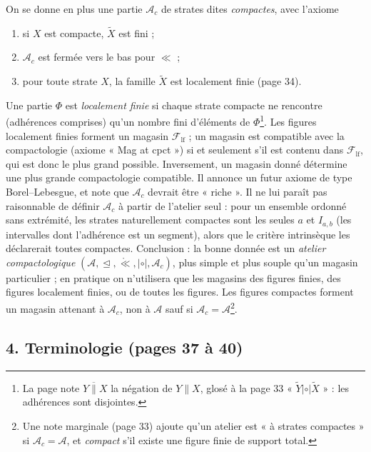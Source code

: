 \documentclass[11pt,a4paper]{article}
\begin{document}
On se donne en plus une partie $\mathcal{A}_{c}$ de strates dites
\emph{compactes}, avec l'axiome
\begin{enumerate}
\item[a)] si $X$ est compacte, $\widetilde{X}$ est fini ;
\item[b)] $\mathcal{A}_{c}$ est fermée vers le bas pour $\ll$ ;
\item[c)] pour toute strate $X$, la famille $\widetilde{X}$ est localement finie
(page 34).
\end{enumerate}
Une partie $\Phi$ est \emph{localement finie} si chaque strate compacte ne
rencontre (adhérences comprises) qu'un nombre fini d'éléments de
$\Phi$\footnote{La page note $Y \mathbin{\overline{\|}} X$ la négation de $Y
\mathbin{\|} X$, glosé à la page 33 « $\widetilde{Y} \mathrel{|\circ|}
\widetilde{X}$ » : les adhérences sont disjointes.}. Les figures localement
finies forment un magasin $\mathcal{F}_{\mathrm{lf}}$ ; un magasin est
compatible avec la compactologie (axiome « Mag at cpct ») si et seulement s'il
est contenu dans $\mathcal{F}_{\mathrm{lf}}$, qui est donc le plus grand
possible. Inversement, un magasin donné détermine une plus grande compactologie
compatible. Il annonce un futur axiome de type Borel--Lebesgue, et note que
$\mathcal{A}_{c}$ devrait être « riche ». Il ne lui paraît pas raisonnable de
définir $\mathcal{A}_{c}$ à partir de l'atelier seul : pour un ensemble ordonné
sans extrémité, les strates naturellement compactes sont les seules $a$ et
$I_{a,b}$ (les intervalles dont l'adhérence est un segment), alors que le
critère intrinsèque les déclarerait toutes compactes. Conclusion : la bonne
donnée est un \emph{atelier compactologique} $(\mathcal{A}, \trianglelefteq,
\mathrel{\mathring{\ll}}, \mathrel{|\circ|}, \mathcal{A}_{c})$, plus simple et
plus souple qu'un magasin particulier ; en pratique on n'utilisera que les
magasins des figures finies, des figures localement finies, ou de toutes les
figures. Les figures compactes forment un magasin attenant à $\mathcal{A}_{c}$,
non à $\mathcal{A}$ sauf si $\mathcal{A}_{c} = \mathcal{A}$\footnote{Une note
marginale (page 33) ajoute qu'un atelier est « à strates compactes » si
$\mathcal{A}_{c} = \mathcal{A}$, et \emph{compact} s'il existe une figure finie
de support total.}.

\subsection*{4. Terminologie (pages 37 à 40)}
\end{document}
